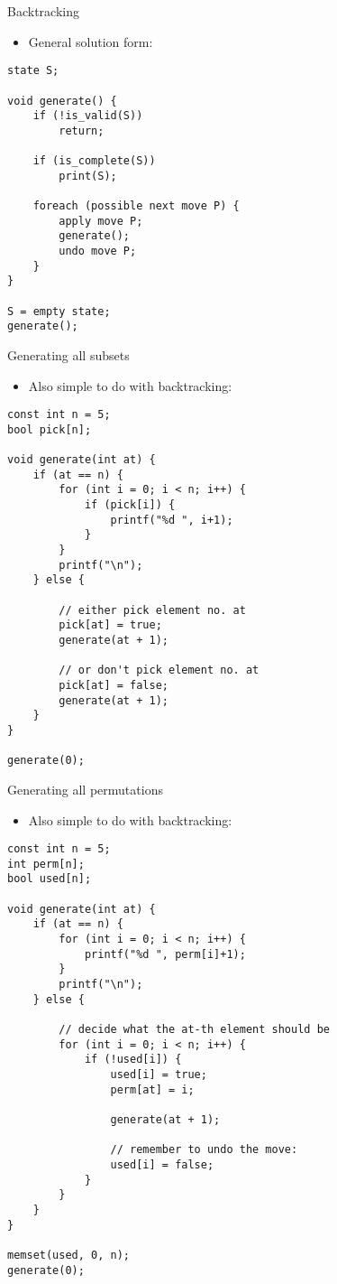 \documentclass[10pt]{beamer}
\newcommand{\bi}{\begin{itemize}}
\newcommand{\ei}{\end{itemize}}
\begin{document}
\begin{frame}[fragile]{Backtracking}
    \bi
        \item General solution form:
    \ei

    \begin{verbatim}
state S;

void generate() {
    if (!is_valid(S))
        return;

    if (is_complete(S))
        print(S);

    foreach (possible next move P) {
        apply move P;
        generate();
        undo move P;
    }
}

S = empty state;
generate();
    \end{verbatim}
\end{frame}


\begin{frame}[fragile]{Generating all subsets}
    \bi
        \item Also simple to do with backtracking:
    \ei
    \begin{verbatim}
const int n = 5;
bool pick[n];

void generate(int at) {
    if (at == n) {
        for (int i = 0; i < n; i++) {
            if (pick[i]) {
                printf("%d ", i+1);
            }
        }
        printf("\n");
    } else {

        // either pick element no. at
        pick[at] = true;
        generate(at + 1);

        // or don't pick element no. at
        pick[at] = false;
        generate(at + 1);
    }
}

generate(0);
    \end{verbatim}
\end{frame}


\begin{frame}[fragile]{Generating all permutations}
    \bi
        \item Also simple to do with backtracking:
    \ei
    \begin{verbatim}
const int n = 5;
int perm[n];
bool used[n];

void generate(int at) {
    if (at == n) {
        for (int i = 0; i < n; i++) {
            printf("%d ", perm[i]+1);
        }
        printf("\n");
    } else {

        // decide what the at-th element should be
        for (int i = 0; i < n; i++) {
            if (!used[i]) {
                used[i] = true;
                perm[at] = i;

                generate(at + 1);

                // remember to undo the move:
                used[i] = false;
            }
        }
    }
}

memset(used, 0, n);
generate(0);
    \end{verbatim}
\end{frame}
\end{document}
